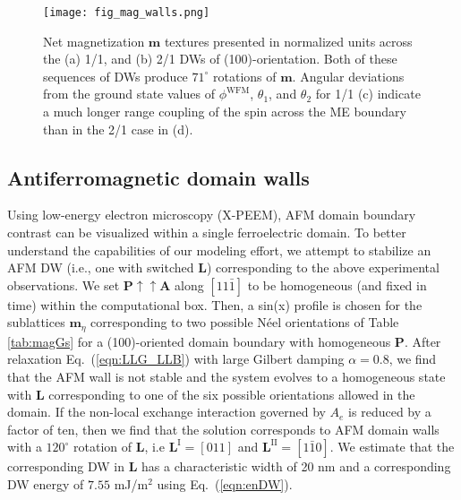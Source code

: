 \documentclass[%
 reprint,
superscriptaddress,
 amsmath,amssymb,
prb,
]{revtex4-1}
\begin{document}
%
\begin{figure*}\centering
\hspace*{-10pt}\texttt{[image: fig\_mag\_walls.png]}%
\caption{\label{fig:mag_walls} Net magnetization $\mathbf{m}$ textures presented in normalized units across the (a) 1/1, and (b) 2/1 DWs of (100)-orientation. Both of these sequences of DWs produce $71^\circ$ rotations of $\mathbf{m}$. Angular deviations from the ground state values of $\phi^\mathrm{WFM}$, $\theta_1$, and $\theta_2$ for 1/1 (c) indicate a much longer range coupling of the spin across the ME boundary than in the 2/1 case in (d).}
\end{figure*}

\subsection{Antiferromagnetic domain walls}\label{sec:magDW}

%
%
Using low-energy electron microscopy (X-PEEM), AFM domain boundary contrast can be visualized\cite{Moubah2012} within a single ferroelectric domain.
%
To better understand the capabilities of our modeling effort, we attempt to stabilize an AFM DW (i.e., one with switched $\mathbf{L}$) corresponding to the above experimental observations.
%
We set $\mathbf{P}\uparrow\uparrow \mathbf{A}$ along $[11\bar{1}]$ to be homogeneous (and fixed in time) within the computational box. 
%
Then, a sin(x) profile is chosen for the sublattices $\mathbf{m}_\eta$ corresponding to two possible N\'{e}el orientations of Table \ref{tab:magGs} for a (100)-oriented domain boundary with homogeneous $\mathbf{P}$.
%
After relaxation Eq.~(\ref{eqn:LLG_LLB}) with large Gilbert damping $\alpha = 0.8$, we find that the AFM wall is not stable and the system evolves to a homogeneous state with $\mathbf{L}$ corresponding to one of the six possible orientations allowed in the domain. 
%
If the non-local exchange interaction governed by $A_e$\cite{Agbelele2017} is reduced by a factor of ten, then we find that the solution corresponds to AFM domain walls with a $120^\circ$ rotation of $\mathbf{L}$, i.e $\mathbf{L}^\mathrm{I} = [011]$ and $\mathbf{L}^\mathrm{II} = [1\bar{1}0]$.
%
We estimate that the corresponding DW in $\mathbf{L}$ has a characteristic width of 20 nm and a corresponding DW energy of $7.55$ mJ/$\mathrm{m}^2$ using Eq.~(\ref{eqn:enDW}).
\end{document}
